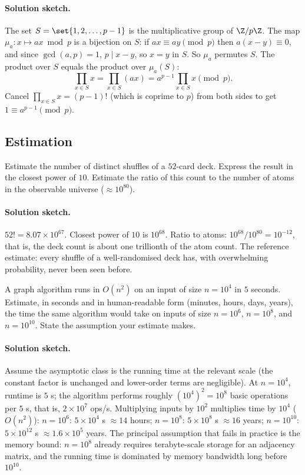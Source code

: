 \paragraph{Solution sketch.}
The set $S = \set{1, 2, \ldots, p - 1}$ is the multiplicative
group of $\Z/p\Z$. The map $\mu_{a}: x \mapsto a x \bmod p$ is a
bijection on $S$: if $a x \equiv a y \pmod{p}$ then $a (x - y)
\equiv 0$, and since $\gcd(a, p) = 1$, $p \mid x - y$, so $x = y$
in $S$. So $\mu_{a}$ permutes $S$. The product over $S$ equals
the product over $\mu_{a}(S)$:
\[
\prod_{x \in S} x = \prod_{x \in S} (a x) = a^{p - 1}
\prod_{x \in S} x \pmod{p}.
\]
Cancel $\prod_{x \in S} x = (p - 1)!$ (which is coprime to $p$)
from both sides to get $1 \equiv a^{p - 1} \pmod{p}$.

\subsection*{Estimation}

\begin{exercise}
Estimate the number of distinct shuffles of a $52$-card deck.
Express the result in the closest power of $10$. Estimate the
ratio of this count to the number of atoms in the observable
universe ($\approx 10^{80}$).
\end{exercise}

\paragraph{Solution sketch.}
$52! = 8.07 \times 10^{67}$. Closest power of $10$ is $10^{68}$.
Ratio to atoms: $10^{68} / 10^{80} = 10^{-12}$, that is, the deck
count is about one trillionth of the atom count. The reference
estimate: every shuffle of a well-randomised deck has, with
overwhelming probability, never been seen before.

\begin{exercise}
A graph algorithm runs in $O(n^{2})$ on an input of size $n =
10^{4}$ in $5$ seconds. Estimate, in seconds and in human-readable
form (minutes, hours, days, years), the time the same algorithm
would take on inputs of size $n = 10^{6}$, $n = 10^{8}$, and $n =
10^{10}$. State the assumption your estimate makes.
\end{exercise}

\paragraph{Solution sketch.}
Assume the asymptotic class is the running time at the relevant
scale (the constant factor is unchanged and lower-order terms are
negligible). At $n = 10^{4}$, runtime is $5$ s; the algorithm
performs roughly $(10^{4})^{2} = 10^{8}$ basic operations per
$5$ s, that is, $2 \times 10^{7}$ ops/s. Multiplying inputs by
$10^{2}$ multiplies time by $10^{4}$ ($O(n^{2})$):
$n = 10^{6}$: $5 \times 10^{4}$ s $\approx 14$ hours;
$n = 10^{8}$: $5 \times 10^{8}$ s $\approx 16$ years;
$n = 10^{10}$: $5 \times 10^{12}$ s $\approx 1.6 \times 10^{5}$
years. The principal assumption that fails in practice is the
memory bound: $n = 10^{8}$ already requires terabyte-scale storage
for an adjacency matrix, and the running time is dominated by
memory bandwidth long before $10^{10}$.

